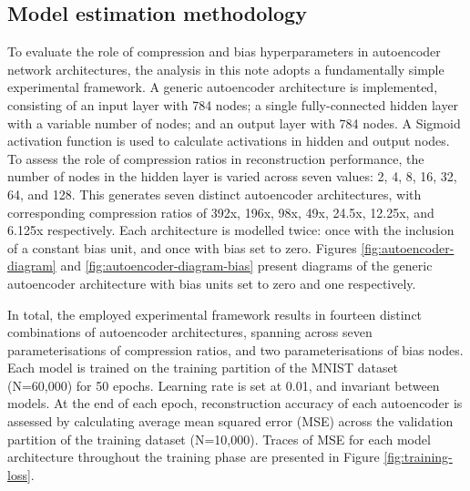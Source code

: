 \subsection{Model estimation methodology}\label{sec:estimation}

To evaluate the role of compression and bias hyperparameters in autoencoder network architectures, the analysis in this note adopts a fundamentally simple experimental framework.
A generic autoencoder architecture is implemented, consisting of an input layer with 784 nodes; a single fully-connected hidden layer with a variable number of nodes; and an output layer with 784 nodes.
A Sigmoid activation function is used to calculate activations in hidden and output nodes. 
To assess the role of compression ratios in reconstruction performance, the number of nodes in the hidden layer is varied across seven values: 2, 4, 8, 16, 32, 64, and 128.
This generates seven distinct autoencoder architectures, with corresponding compression ratios of 392x, 196x, 98x, 49x, 24.5x, 12.25x, and 6.125x respectively.
Each architecture is modelled twice: once with the inclusion of a constant bias unit, and once with bias set to zero.
Figures \ref{fig:autoencoder-diagram} and \ref{fig:autoencoder-diagram-bias} present diagrams of the generic autoencoder architecture with bias units set to zero and one respectively.

In total, the employed experimental framework results in fourteen distinct combinations of autoencoder architectures, spanning across seven parameterisations of compression ratios, and two parameterisations of bias nodes. 
Each model is trained on the training partition of the MNIST dataset (N=60,000) for 50 epochs.
Learning rate is set at 0.01, and invariant between models.
At the end of each epoch, reconstruction accuracy of each autoencoder is assessed by calculating average mean squared error (MSE) across the validation partition of the training dataset (N=10,000).
Traces of MSE for each model architecture throughout the training phase are presented in Figure \ref{fig:training-loss}.



